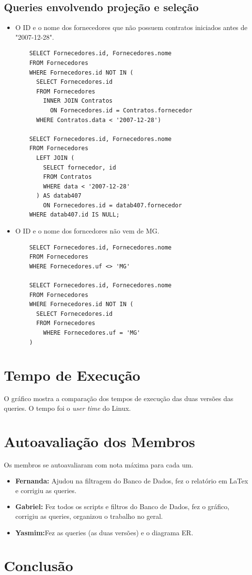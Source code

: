 \documentclass{article}
\begin{document}
\subsection{Queries envolvendo projeção e seleção}
\begin{itemize}
\item O ID e o nome dos fornecedores que não possuem contratos iniciados antes de "2007-12-28".
  \begin{verbatim}
    SELECT Fornecedores.id, Fornecedores.nome
    FROM Fornecedores
    WHERE Fornecedores.id NOT IN (
      SELECT Fornecedores.id
      FROM Fornecedores
        INNER JOIN Contratos
          ON Fornecedores.id = Contratos.fornecedor
      WHERE Contratos.data < '2007-12-28')
      
    SELECT Fornecedores.id, Fornecedores.nome
    FROM Fornecedores
      LEFT JOIN (
        SELECT fornecedor, id
        FROM Contratos
        WHERE data < '2007-12-28'
      ) AS datab407
        ON Fornecedores.id = datab407.fornecedor 
    WHERE datab407.id IS NULL;
    \end{verbatim}
\item O ID e o nome dos forncedores não vem de MG.
  \begin{verbatim}
    SELECT Fornecedores.id, Fornecedores.nome
    FROM Fornecedores
    WHERE Fornecedores.uf <> 'MG'

    SELECT Fornecedores.id, Fornecedores.nome
    FROM Fornecedores
    WHERE Fornecedores.id NOT IN (
      SELECT Fornecedores.id
      FROM Fornecedores
	    WHERE Fornecedores.uf = 'MG'
    )

    \end{verbatim}
\end{itemize}

\section{Tempo de Execução}
O gráfico mostra a comparação dos tempos de execução das duas versões das queries.
O tempo foi o \textit{user time} do Linux.
\begin{figure}[H]
  \begin{center}  
        
  \end{center}  
  \label{fig:graph}
\end{figure}

\section{Autoavaliação dos Membros}
Os membros se autoavaliaram com nota máxima para cada um.
\begin{itemize}
\item \textbf{Fernanda:} Ajudou na filtragem do Banco de Dados, fez o relatório em LaTex e corrigiu as queries.
\item \textbf{Gabriel:} Fez todos os scripts e filtros do Banco de Dados, fez o gráfico, corrigiu as queries, organizou o trabalho no geral.
\item \textbf{Yasmim:}Fez as queries (as duas versões) e o diagrama ER.  
\end{itemize}
\section{Conclusão}



\end{document}
